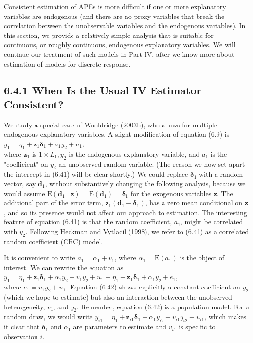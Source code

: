 \documentclass[10pt]{article}
\begin{document}
Consistent estimation of APEs is more difficult if one or more explanatory variables are endogenous (and there are no proxy variables that break the correlation between the unobservable variables and the endogenous variables). In this section, we provide a relatively simple analysis that is suitable for continuous, or roughly continuous, endogenous explanatory variables. We will continue our treatment of such models in Part IV, after we know more about estimation of models for discrete response.

\subsection*{6.4.1 When Is the Usual IV Estimator Consistent?}
We study a special case of Wooldridge (2003b), who allows for multiple endogenous explanatory variables. A slight modification of equation (6.9) is\\
$y_{1}=\eta_{1}+\mathbf{z}_{1} \boldsymbol{\delta}_{1}+a_{1} y_{2}+u_{1}$,\\
where $\mathbf{z}_{1}$ is $1 \times L_{1}, y_{2}$ is the endogenous explanatory variable, and $a_{1}$ is the "coefficient" on $y_{2}$-an unobserved random variable. (The reason we now set apart the intercept in (6.41) will be clear shortly.) We could replace $\boldsymbol{\delta}_{1}$ with a random vector, say $\mathbf{d}_{1}$, without substantively changing the following analysis, because we would assume $\mathrm{E}\left(\mathbf{d}_{1} \mid \mathbf{z}\right)=\mathrm{E}\left(\mathbf{d}_{1}\right)=\boldsymbol{\delta}_{1}$ for the exogenous variables $\mathbf{z}$. The additional part of the error term, $\mathbf{z}_{1}\left(\mathbf{d}_{1}-\boldsymbol{\delta}_{1}\right)$, has a zero mean conditional on $\mathbf{z}$, and so its presence would not affect our approach to estimation. The interesting feature of equation (6.41) is that the random coefficient, $a_{1}$, might be correlated with $y_{2}$. Following Heckman and Vytlacil (1998), we refer to (6.41) as a correlated random coefficient (CRC) model.

It is convenient to write $a_{1}=\alpha_{1}+v_{1}$, where $\alpha_{1}=\mathrm{E}\left(a_{1}\right)$ is the object of interest. We can rewrite the equation as\\
$y_{1}=\eta_{1}+\mathbf{z}_{1} \boldsymbol{\delta}_{1}+\alpha_{1} y_{2}+v_{1} y_{2}+u_{1} \equiv \eta_{1}+\mathbf{z}_{1} \boldsymbol{\delta}_{1}+\alpha_{1} y_{2}+e_{1}$,\\
where $e_{1}=v_{1} y_{2}+u_{1}$. Equation (6.42) shows explicitly a constant coefficient on $y_{2}$ (which we hope to estimate) but also an interaction between the unobserved heterogeneity, $v_{1}$, and $y_{2}$. Remember, equation (6.42) is a population model. For a random draw, we would write $y_{i 1}=\eta_{1}+\mathbf{z}_{i 1} \boldsymbol{\delta}_{1}+\alpha_{1} y_{i 2}+v_{i 1} y_{i 2}+u_{i 1}$, which makes it clear that $\boldsymbol{\delta}_{1}$ and $\alpha_{1}$ are parameters to estimate and $v_{i 1}$ is specific to observation $i$.
\end{document}
